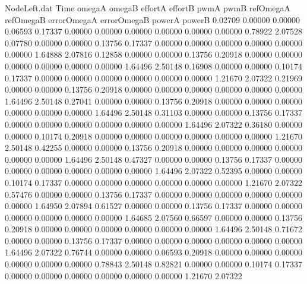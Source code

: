 \begin{filecontents}{NodeLeft.dat}
Time omegaA omegaB effortA effortB pwmA pwmB refOmegaA refOmegaB errorOmegaA errorOmegaB powerA powerB
   0.02709    0.00000    0.00000     0.06593    0.17337    0.00000    0.00000    0.00000    0.00000    0.00000    0.00000    0.78922    2.07528
   0.07780    0.00000    0.00000     0.13756    0.17337    0.00000    0.00000    0.00000    0.00000    0.00000    0.00000    1.64888    2.07816
   0.12858    0.00000    0.00000     0.13756    0.20918    0.00000    0.00000    0.00000    0.00000    0.00000    0.00000    1.64496    2.50148
   0.16908    0.00000    0.00000     0.10174    0.17337    0.00000    0.00000    0.00000    0.00000    0.00000    0.00000    1.21670    2.07322
   0.21969    0.00000    0.00000     0.13756    0.20918    0.00000    0.00000    0.00000    0.00000    0.00000    0.00000    1.64496    2.50148
   0.27041    0.00000    0.00000     0.13756    0.20918    0.00000    0.00000    0.00000    0.00000    0.00000    0.00000    1.64496    2.50148
   0.31103    0.00000    0.00000     0.13756    0.17337    0.00000    0.00000    0.00000    0.00000    0.00000    0.00000    1.64496    2.07322
   0.36180    0.00000    0.00000     0.10174    0.20918    0.00000    0.00000    0.00000    0.00000    0.00000    0.00000    1.21670    2.50148
   0.42255    0.00000    0.00000     0.13756    0.20918    0.00000    0.00000    0.00000    0.00000    0.00000    0.00000    1.64496    2.50148
   0.47327    0.00000    0.00000     0.13756    0.17337    0.00000    0.00000    0.00000    0.00000    0.00000    0.00000    1.64496    2.07322
   0.52395    0.00000    0.00000     0.10174    0.17337    0.00000    0.00000    0.00000    0.00000    0.00000    0.00000    1.21670    2.07322
   0.57476    0.00000    0.00000     0.13756    0.17337    0.00000    0.00000    0.00000    0.00000    0.00000    0.00000    1.64950    2.07894
   0.61527    0.00000    0.00000     0.13756    0.17337    0.00000    0.00000    0.00000    0.00000    0.00000    0.00000    1.64685    2.07560
   0.66597    0.00000    0.00000     0.13756    0.20918    0.00000    0.00000    0.00000    0.00000    0.00000    0.00000    1.64496    2.50148
   0.71672    0.00000    0.00000     0.13756    0.17337    0.00000    0.00000    0.00000    0.00000    0.00000    0.00000    1.64496    2.07322
   0.76744    0.00000    0.00000     0.06593    0.20918    0.00000    0.00000    0.00000    0.00000    0.00000    0.00000    0.78843    2.50148
   0.82821    0.00000    0.00000     0.10174    0.17337    0.00000    0.00000    0.00000    0.00000    0.00000    0.00000    1.21670    2.07322

\end{filecontents}
